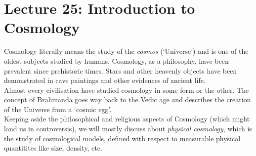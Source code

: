 \section*{Lecture 25: Introduction to Cosmology}
Cosmology literally means the study of the \textit{cosmos} (`Universe') and is one of the oldest subjects studied by humans. Cosmology, as a philosophy, have been prevalent since prehistoric times. Stars and other heavenly objects have been demonstrated in cave paintings and other evidences of ancient life. \\[0.2cm]
Almost every civilisation have studied cosmology in some form or the other. The concept of Brahmanda goes way back to the Vedic age and describes the creation of the Universe from a `cosmic egg'. \\[0.2cm]
Keeping aside the philosophical and religious aspects of Cosmology (which might land us in controversis), we will mostly discuss about \textit{physical cosmology}, which is the study of cosmological models, defined with respect to measurable physical quantitites like size, density, etc. 
